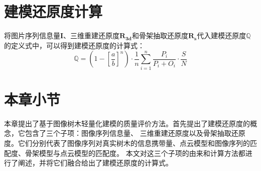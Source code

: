 \section{建模还原度计算}
将图片序列信息量$\mathbf{I}$、三维重建还原度$\mathbf{R_{3d}}$和骨架抽取还原度$\mathbf{R_s}$代入建模还原度$\mathbb{Q}$
的定义式中，可以得到建模还原度的计算式：\\
\begin{equation}
	\mathbb{Q}= (1-[\frac{a}{b}]^n)\cdot \frac{1}{n}\sum_{i=1}^n \frac{P_i}{P_i+O_i} \cdot \frac{S}{N}
\end{equation}

\section{本章小节}
本章提出了基于图像树木轻量化建模的质量评价方法。首先提出了建模还原度的概念，它包含了三个子项：图像序列信息量、
三维重建还原度以及骨架抽取还原度。它们分别代表了图像序列对真实树木的信息携带量、点云模型和图像序列的匹配度、骨架模型与点云模型的匹配度。
本文对这三个子项的由来和计算方法都进行了阐述，并将它们融合给出了建模还原度的计算式。
